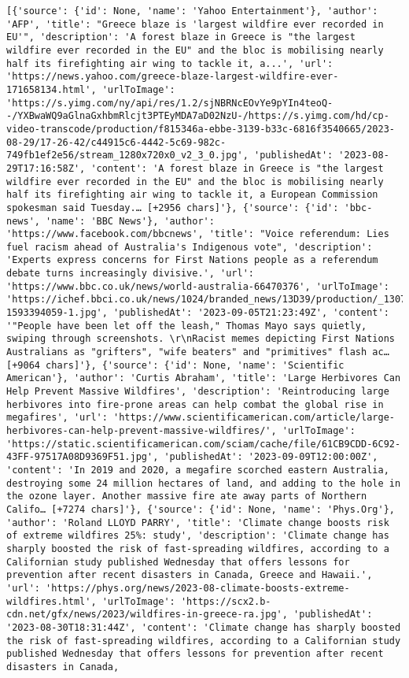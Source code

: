 \documentclass[
  letterpaper,
  DIV=11,
  numbers=noendperiod]{scrartcl}
\begin{document}
\begin{verbatim}
[{'source': {'id': None, 'name': 'Yahoo Entertainment'}, 'author': 'AFP', 'title': "Greece blaze is 'largest wildfire ever recorded in EU'", 'description': 'A forest blaze in Greece is "the largest wildfire ever recorded in the EU" and the bloc is mobilising nearly half its firefighting air wing to tackle it, a...', 'url': 'https://news.yahoo.com/greece-blaze-largest-wildfire-ever-171658134.html', 'urlToImage': 'https://s.yimg.com/ny/api/res/1.2/sjNBRNcEOvYe9pYIn4teoQ--/YXBwaWQ9aGlnaGxhbmRlcjt3PTEyMDA7aD02NzU-/https://s.yimg.com/hd/cp-video-transcode/production/f815346a-ebbe-3139-b33c-6816f3540665/2023-08-29/17-26-42/c44915c6-4442-5c69-982c-749fb1ef2e56/stream_1280x720x0_v2_3_0.jpg', 'publishedAt': '2023-08-29T17:16:58Z', 'content': 'A forest blaze in Greece is "the largest wildfire ever recorded in the EU" and the bloc is mobilising nearly half its firefighting air wing to tackle it, a European Commission spokesman said Tuesday.… [+2956 chars]'}, {'source': {'id': 'bbc-news', 'name': 'BBC News'}, 'author': 'https://www.facebook.com/bbcnews', 'title': "Voice referendum: Lies fuel racism ahead of Australia's Indigenous vote", 'description': 'Experts express concerns for First Nations people as a referendum debate turns increasingly divisive.', 'url': 'https://www.bbc.co.uk/news/world-australia-66470376', 'urlToImage': 'https://ichef.bbci.co.uk/news/1024/branded_news/13D39/production/_130790218_gettyimages-1593394059-1.jpg', 'publishedAt': '2023-09-05T21:23:49Z', 'content': '"People have been let off the leash," Thomas Mayo says quietly, swiping through screenshots. \r\nRacist memes depicting First Nations Australians as "grifters", "wife beaters" and "primitives" flash ac… [+9064 chars]'}, {'source': {'id': None, 'name': 'Scientific American'}, 'author': 'Curtis Abraham', 'title': 'Large Herbivores Can Help Prevent Massive Wildfires', 'description': 'Reintroducing large herbivores into fire-prone areas can help combat the global rise in megafires', 'url': 'https://www.scientificamerican.com/article/large-herbivores-can-help-prevent-massive-wildfires/', 'urlToImage': 'https://static.scientificamerican.com/sciam/cache/file/61CB9CDD-6C92-43FF-97517A08D9369F51.jpg', 'publishedAt': '2023-09-09T12:00:00Z', 'content': 'In 2019 and 2020, a megafire scorched eastern Australia, destroying some 24 million hectares of land, and adding to the hole in the ozone layer. Another massive fire ate away parts of Northern Califo… [+7274 chars]'}, {'source': {'id': None, 'name': 'Phys.Org'}, 'author': 'Roland LLOYD PARRY', 'title': 'Climate change boosts risk of extreme wildfires 25%: study', 'description': 'Climate change has sharply boosted the risk of fast-spreading wildfires, according to a Californian study published Wednesday that offers lessons for prevention after recent disasters in Canada, Greece and Hawaii.', 'url': 'https://phys.org/news/2023-08-climate-boosts-extreme-wildfires.html', 'urlToImage': 'https://scx2.b-cdn.net/gfx/news/2023/wildfires-in-greece-ra.jpg', 'publishedAt': '2023-08-30T18:31:44Z', 'content': 'Climate change has sharply boosted the risk of fast-spreading wildfires, according to a Californian study published Wednesday that offers lessons for prevention after recent disasters in Canada, 
\end{verbatim}
\end{document}
